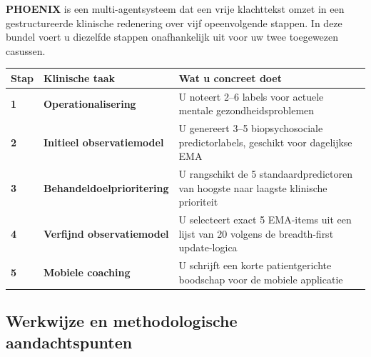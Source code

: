 \documentclass[11pt,a4paper]{article}
\renewcommand{\arraystretch}{1.28}
\begin{document}
\textbf{PHOENIX} is een multi-agentsysteem dat een vrije klachttekst omzet in een
gestructureerde klinische redenering over vijf opeenvolgende stappen. In deze bundel
voert u diezelfde stappen onafhankelijk uit voor uw twee toegewezen casussen.

\begin{center}
\renewcommand{\arraystretch}{1.40}
\small
\begin{tabular}{@{}>{\bfseries\color{PrimaryBlue}}p{}>{\bfseries}p{}p{}@{}}
\toprule
Stap & Klinische taak & Wat u concreet doet \\
\midrule
1 & Operationalisering & U noteert 2--6 labels voor actuele mentale gezondheidsproblemen \\
2 & Initieel observatiemodel & U genereert 3--5 biopsychosociale predictorlabels, geschikt voor dagelijkse EMA \\
3 & Behandeldoelprioritering & U rangschikt de 5 standaardpredictoren van hoogste naar laagste klinische prioriteit \\
4 & Verfijnd observatiemodel & U selecteert exact 5 EMA-items uit een lijst van 20 volgens de breadth-first update-logica \\
5 & Mobiele coaching & U schrijft een korte patientgerichte boodschap voor de mobiele applicatie \\
\bottomrule
\end{tabular}
\end{center}

\subsection{Werkwijze en methodologische aandachtspunten}
\end{document}
